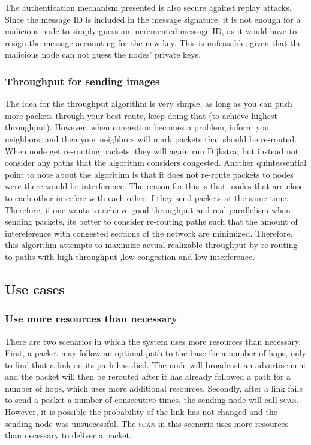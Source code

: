 \documentclass[letterpaper]{article}
\begin{document}
\noindent The authentication mechanism presented is also secure against replay attacks. Since the message ID is included in the message signature, it is not enough for a malicious node to simply guess an incremented message ID, as it would have to resign the message accounting for the new key. This is unfeasable, given that the malicious node can not guess the nodes' private keys.

\subsubsection{Throughput for sending images}

The idea for the throughput algorithm is very simple, as long as you can push more packets through your best route, keep doing that (to achieve highest throughput). However, when congestion becomes a problem, inform you neighbors, and then your neighbors will mark packets that should be re-routed. When node get re-routing packets, they will again run Dijkstra, but instead not consider any paths that the algorithm considers congested. Another quintessential point to note about the algorithm is that it does not re-route packets to nodes were there would be interference. The reason for this is that, nodes that are close to each other interfere with each other if they send packets at the same time. Therefore, if one wants to achieve good throughput and real parallelism when sending packets, its better to consider re-routing paths such that the amount of intereference with congested sections of the network are minimized. Therefore, this algorithm attempts to maximize actual realizable throughput by re-routing to paths with high throughput ,low congestion and low interference.


\subsection{Use cases}

\subsubsection{Use more resources than necessary}

There are two scenarios in which the system uses more resources than necessary. First, a packet may follow an optimal path
to the base for a number of hops, only to find that a link on its path has died. The node will broadcast an advertisement
and the packet will then be rerouted after it has already followed a path for a number of hops, which uses more additional
resources. Secondly, after a link fails to send a packet a number of consecutive times, the sending node will call
\textsc{scan}. However, it is possible the probability of the link has not changed and the sending node was unsuccessful.
The \textsc{scan} in this scenario uses more resources than necessary to deliver a packet.
\end{document}
